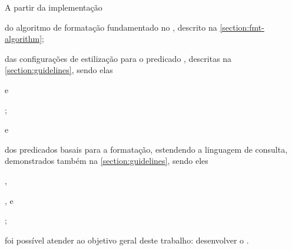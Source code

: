\documentclass
  [11pt,a4paper,english,brazil,openright,sumario=tradicional,twoside]
  {abntex2}
\begin{document}
  A partir da implementação
  \begin{inparaenum}
    \item do algoritmo de formatação fundamentado no \treesitter, descrito na
          \cref{section:fmt-algorithm};
    \item das configurações de estilização para o predicado
          , descritas na \cref{section:guidelines},
          sendo elas
          \begin{inparaenum}
            \item {} e
            \item {};
          \end{inparaenum}
          e
    \item dos predicados basais para a formatação, estendendo a linguagem de
          consulta, demonstrados também na \cref{section:guidelines}, sendo
          eles
          \begin{inparaenum}
            \item {},
            \item {}, e
            \item {};
          \end{inparaenum}
  \end{inparaenum}
  foi possível atender ao objetivo geral deste trabalho: desenvolver o
  \witchcooking \cite{silva-2023-witch}.
\end{document}
